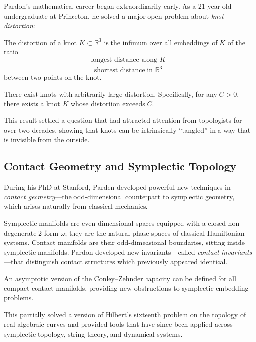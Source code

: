 Pardon's mathematical career began extraordinarily early. As a 21-year-old undergraduate at Princeton, he solved a major open problem about \emph{knot distortion}:

\begin{definition}
The distortion of a knot $K \subset \mathbb{R}^3$ is the infimum over all embeddings of $K$ of the ratio
\[
\frac{\text{longest distance along } K}{\text{shortest distance in } \mathbb{R}^3}
\]
between two points on the knot.
\end{definition}

\begin{theorem}
There exist knots with arbitrarily large distortion. Specifically, for any $C > 0$, there exists a knot $K$ whose distortion exceeds $C$.
\end{theorem}

This result settled a question that had attracted attention from topologists for over two decades, showing that knots can be intrinsically ``tangled'' in a way that is invisible from the outside.

\subsection{Contact Geometry and Symplectic Topology}
During his PhD at Stanford, Pardon developed powerful new techniques in \emph{contact geometry}---the odd-dimensional counterpart to symplectic geometry, which arises naturally from classical mechanics.

Symplectic manifolds are even-dimensional spaces equipped with a closed non-degenerate 2-form $\omega$; they are the natural phase spaces of classical Hamiltonian systems. Contact manifolds are their odd-dimensional boundaries, sitting inside symplectic manifolds. Pardon developed new invariants---called \emph{contact invariants}---that distinguish contact structures which previously appeared identical.

\begin{theorem}
An asymptotic version of the Conley--Zehnder capacity can be defined for all compact contact manifolds, providing new obstructions to symplectic embedding problems.
\end{theorem}

This partially solved a version of Hilbert's sixteenth problem on the topology of real algebraic curves and provided tools that have since been applied across symplectic topology, string theory, and dynamical systems.

